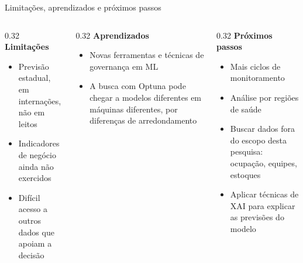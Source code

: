 \documentclass[aspectratio=169,10pt]{beamer}
\begin{document}
\begin{frame}{Limitações, aprendizados e próximos passos}
  \vfill
  \begin{columns}[T,onlytextwidth]
    \begin{column}[T]{0.32\textwidth}
      \vspace{0pt}
      {\color{nivelalerta}\large\textbf{Limitações}}\par
      \vspace{0.25cm}
      \small
      \begin{itemize}
        \setlength{\itemsep}{6pt}
        \item Previsão estadual, em internações, não em leitos
        \item Indicadores de negócio ainda não exercidos
        \item Difícil acesso a outros dados que apoiam a decisão
      \end{itemize}
    \end{column}
    \begin{column}[T]{0.32\textwidth}
      \vspace{0pt}
      {\color{uelgreen}\large\textbf{Aprendizados}}\par
      \vspace{0.25cm}
      \small
      \begin{itemize}
        \setlength{\itemsep}{6pt}
        \item Novas ferramentas e técnicas de governança em ML
        \item A busca com Optuna pode chegar a modelos diferentes em máquinas diferentes, por diferenças de arredondamento
      \end{itemize}
    \end{column}
    \begin{column}[T]{0.32\textwidth}
      \vspace{0pt}
      {\color{dcblue}\large\textbf{Próximos passos}}\par
      \vspace{0.25cm}
      \small
      \begin{itemize}
        \setlength{\itemsep}{6pt}
        \item Mais ciclos de monitoramento
        \item Análise por regiões de saúde
        \item Buscar dados fora do escopo desta pesquisa: ocupação, equipes, estoques
        \item Aplicar técnicas de XAI para explicar as previsões do modelo
      \end{itemize}
    \end{column}
  \end{columns}
  \vfill
\end{frame}

\obrigado[Perguntas?]
\end{document}
